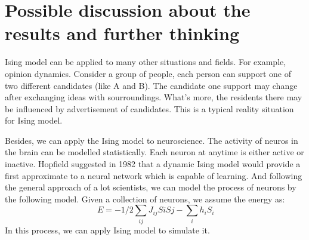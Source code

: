 \documentclass[11pt,openany]{book}              %
\begin{document}
\section{ Possible discussion about the results and further thinking }
Ising model can be applied to many other situations and fields. For example, opinion dynamics.
Consider a group of people, each person can support one of two different candidates (like A and B).
The candidate one support may change after exchanging ideas with sourroundings. 
What's more, the residents there may be influenced by advertisement of candidates. This is a typical
reality situation for Ising model.

Besides, we can apply the Ising model to neuroscience. The activity of neuros in the brain can be 
modelled statistically. Each neuron at anytime is either active or inactive. Hopfield suggested in 1982
that a dynamic Ising model would provide a first approximate to a neural network which is capable of learning.
And following the general approach of a lot scientists, we can model the process of neurons by the following 
model. Given a collection of neurons, we assume the energy as:
\begin{equation}
\, E = -1/2 \sum_{ij}J_{ij}SiSj-\sum_i h_iS_i
\end{equation}
In this process, we can apply Ising model to simulate it. 


%
%
\end{document}

